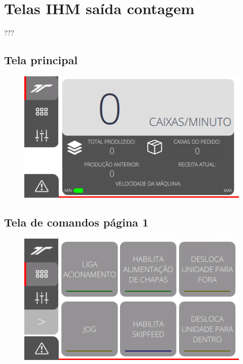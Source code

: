 \thispagestyle{fancy}
\vspace*{\fill}
\section{Telas IHM saída contagem}
 ???
\subsection{\small{Tela principal}}
\begin{figure}[h]
  \centering
  \includegraphics{src/imagesFlexo/12-IHMCNT/e-1.png}
\end{figure}
\vspace*{\fill}

\newpage
\thispagestyle{fancy}
\vspace*{\fill}
\subsection{\small{Tela de comandos página 1}}
\begin{figure}[h]
  \centering
  \includegraphics{src/imagesFlexo/12-IHMCNT/e-2.png}
\end{figure}
\vspace*{\fill}

